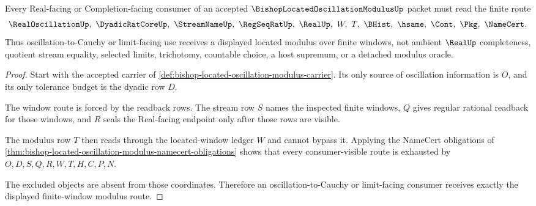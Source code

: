 \begin{theorem}
\label{thm:bishop-located-oscillation-modulus-window-route}
Every Real-facing or Completion-facing consumer of an accepted $\BishopLocatedOscillationModulusUp$ packet must read the finite route
$$
\RealOscillationUp,\ \DyadicRatCoreUp,\ \StreamNameUp,\ \RegSeqRatUp,\ \RealUp,\ W,\ T,\ \BHist,\ \hsame,\ \Cont,\ \Pkg,\ \NameCert .
$$
Thus oscillation-to-Cauchy or limit-facing use receives a displayed located modulus over finite windows, not ambient $\RealUp$ completeness, quotient stream equality, selected limits, trichotomy, countable choice, a host supremum, or a detached modulus oracle.
\end{theorem}
\begin{proof}
Start with the accepted carrier of \autoref{def:bishop-located-oscillation-modulus-carrier}. Its only source of oscillation information is $O$, and its only tolerance budget is the dyadic row $D$.

The window route is forced by the readback rows. The stream row $S$ names the inspected finite windows, $Q$ gives regular rational readback for those windows, and $R$ seals the Real-facing endpoint only after those rows are visible.

The modulus row $T$ then reads through the located-window ledger $W$ and cannot bypass it. Applying the NameCert obligations of \autoref{thm:bishop-located-oscillation-modulus-namecert-obligations} shows that every consumer-visible route is exhausted by $O,D,S,Q,R,W,T,H,C,P,N$.

The excluded objects are absent from those coordinates. Therefore an oscillation-to-Cauchy or limit-facing consumer receives exactly the displayed finite-window modulus route.
\end{proof}



